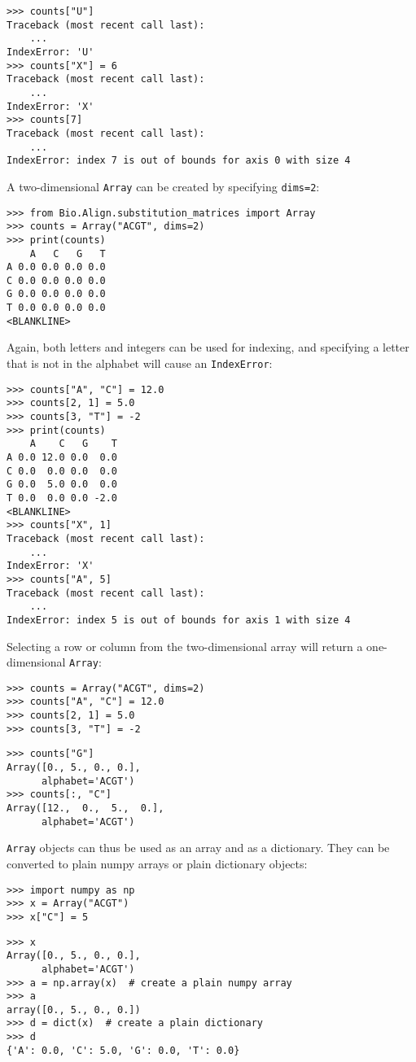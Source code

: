 \begin{verbatim}
>>> counts["U"]
Traceback (most recent call last):
    ...
IndexError: 'U'
>>> counts["X"] = 6
Traceback (most recent call last):
    ...
IndexError: 'X'
>>> counts[7]
Traceback (most recent call last):
    ...
IndexError: index 7 is out of bounds for axis 0 with size 4
\end{verbatim}

A two-dimensional \verb+Array+ can be created by specifying \verb+dims=2+:

\begin{verbatim}
>>> from Bio.Align.substitution_matrices import Array
>>> counts = Array("ACGT", dims=2)
>>> print(counts)
    A   C   G   T
A 0.0 0.0 0.0 0.0
C 0.0 0.0 0.0 0.0
G 0.0 0.0 0.0 0.0
T 0.0 0.0 0.0 0.0
<BLANKLINE>
\end{verbatim}
Again, both letters and integers can be used for indexing, and specifying a letter that is not in the alphabet will cause an \verb+IndexError+:

\begin{verbatim}
>>> counts["A", "C"] = 12.0
>>> counts[2, 1] = 5.0
>>> counts[3, "T"] = -2
>>> print(counts)
    A    C   G    T
A 0.0 12.0 0.0  0.0
C 0.0  0.0 0.0  0.0
G 0.0  5.0 0.0  0.0
T 0.0  0.0 0.0 -2.0
<BLANKLINE>
>>> counts["X", 1]
Traceback (most recent call last):
    ...
IndexError: 'X'
>>> counts["A", 5]
Traceback (most recent call last):
    ...
IndexError: index 5 is out of bounds for axis 1 with size 4
\end{verbatim}
Selecting a row or column from the two-dimensional array will return a one-dimensional \verb+Array+:

\begin{verbatim}
>>> counts = Array("ACGT", dims=2)
>>> counts["A", "C"] = 12.0
>>> counts[2, 1] = 5.0
>>> counts[3, "T"] = -2
\end{verbatim}
\begin{verbatim}
>>> counts["G"]
Array([0., 5., 0., 0.],
      alphabet='ACGT')
>>> counts[:, "C"]
Array([12.,  0.,  5.,  0.],
      alphabet='ACGT')
\end{verbatim}

\verb+Array+ objects can thus be used as an array and as a dictionary. They can be converted to plain numpy arrays or plain dictionary objects:

\begin{verbatim}
>>> import numpy as np
>>> x = Array("ACGT")
>>> x["C"] = 5
\end{verbatim}
\begin{verbatim}
>>> x
Array([0., 5., 0., 0.],
      alphabet='ACGT')
>>> a = np.array(x)  # create a plain numpy array
>>> a
array([0., 5., 0., 0.])
>>> d = dict(x)  # create a plain dictionary
>>> d
{'A': 0.0, 'C': 5.0, 'G': 0.0, 'T': 0.0}
\end{verbatim}

